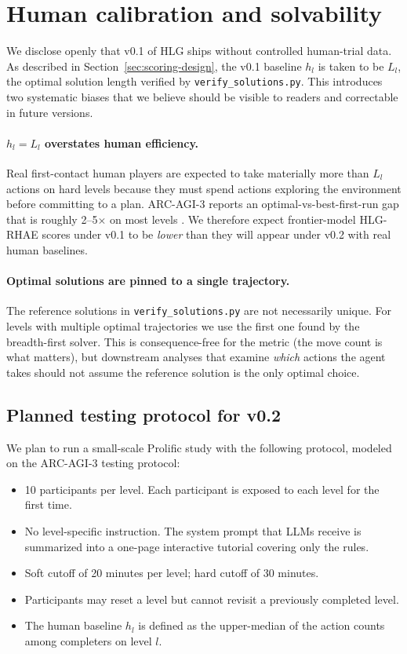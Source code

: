 \section{Human calibration and solvability}
\label{sec:calibration}

We disclose openly that v0.1 of HLG ships without controlled human-trial data. As
described in Section~\ref{sec:scoring-design}, the v0.1 baseline $h_l$ is taken to be
$L_l$, the optimal solution length verified by \texttt{verify\_solutions.py}. This
introduces two systematic biases that we believe should be visible to readers and
correctable in future versions.

\paragraph{$h_l = L_l$ overstates human efficiency.} Real first-contact human players
are expected to take materially more than $L_l$ actions on hard levels because they
must spend actions exploring the environment before committing to a plan. ARC-AGI-3
reports an optimal-vs-best-first-run gap that is roughly 2--5$\times$ on most levels
\cite{arcagi3}. We therefore expect frontier-model HLG-RHAE scores under v0.1 to be
\emph{lower} than they will appear under v0.2 with real human baselines.

\paragraph{Optimal solutions are pinned to a single trajectory.} The reference solutions
in \texttt{verify\_solutions.py} are not necessarily unique. For levels with multiple
optimal trajectories we use the first one found by the breadth-first solver. This is
consequence-free for the metric (the move count is what matters), but downstream
analyses that examine \emph{which} actions the agent takes should not assume the
reference solution is the only optimal choice.

\subsection{Planned testing protocol for v0.2}

We plan to run a small-scale Prolific study with the following protocol, modeled on the
ARC-AGI-3 testing protocol:

\begin{itemize}[leftmargin=1.5em]
    \item 10 participants per level. Each participant is exposed to each level for the
      first time.
    \item No level-specific instruction. The system prompt that LLMs receive is
      summarized into a one-page interactive tutorial covering only the rules.
    \item Soft cutoff of 20 minutes per level; hard cutoff of 30 minutes.
    \item Participants may reset a level but cannot revisit a previously completed
      level.
    \item The human baseline $h_l$ is defined as the upper-median of the action counts
      among completers on level $l$.
\end{itemize}

